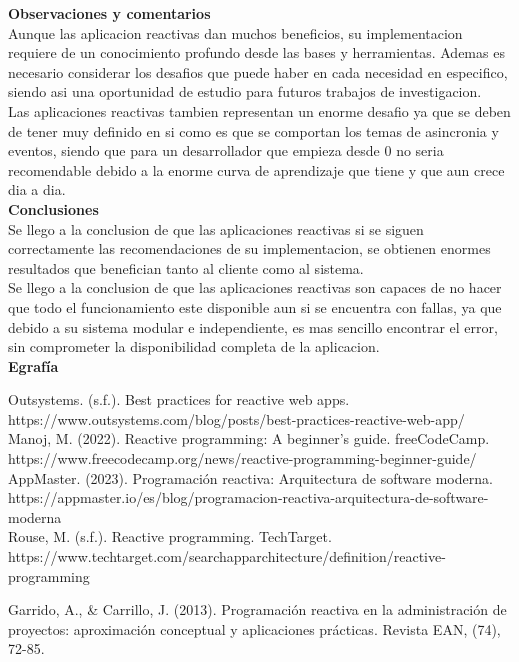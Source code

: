 \documentclass[12pt]{article}
\begin{document}
\noindent\textbf{Observaciones y comentarios} \\
Aunque las aplicacion reactivas dan muchos beneficios, su implementacion requiere de un conocimiento profundo desde las bases y herramientas. Ademas es necesario considerar los desafios que puede haber en cada necesidad en especifico, siendo asi una oportunidad de estudio para futuros trabajos de investigacion. 
\vspace{1em}
\\ Las aplicaciones reactivas tambien representan un enorme desafio ya que se deben de tener muy definido en si como es que se comportan los temas de asincronia y eventos, siendo que para un desarrollador que empieza desde 0 no seria recomendable debido a la enorme curva de aprendizaje que tiene y que aun crece dia a dia.
\vspace{1em} \\
\noindent\textbf{Conclusiones} \\
Se llego a la conclusion de que las aplicaciones reactivas si se siguen correctamente las recomendaciones de su implementacion, se obtienen enormes resultados que benefician tanto al cliente como al sistema.
\vspace{1em}
\\ Se llego a la conclusion de que las aplicaciones reactivas son capaces de no hacer que todo el funcionamiento este disponible aun si se encuentra con fallas, ya que debido a su sistema modular e independiente, es mas sencillo encontrar el error, sin comprometer la disponibilidad completa de la aplicacion. \\


\noindent\textbf{Egrafía}\\
\begin{sloppypar}
Outsystems. (s.f.). Best practices for reactive web apps. \\
https://www.outsystems.com/blog/posts/best-\allowbreak practices-reactive-\allowbreak web-\allowbreak app/ \\[0.5em]

Manoj, M. (2022). Reactive programming: A beginner's guide. freeCodeCamp. \\
https://www.freecodecamp.org/news/reactive-\allowbreak programming-\allowbreak beginner-\allowbreak guide/ \\[0.5em]

AppMaster. (2023). Programación reactiva: Arquitectura de software moderna. \\
https://appmaster.io/es/blog/programacion-\allowbreak reactiva-\allowbreak arquitectura-\allowbreak de-\allowbreak software-\allowbreak moderna \\[0.5em]

Rouse, M. (s.f.). Reactive programming. TechTarget. \\
https://www.techtarget.com/searchapparchitecture/\allowbreak definition/\allowbreak reactive-\allowbreak programming

Garrido, A., & Carrillo, J. (2013). Programación reactiva en la administración de proyectos: aproximación conceptual y aplicaciones prácticas. Revista EAN, (74), 72-85.
\end{sloppypar}
\end{document}
